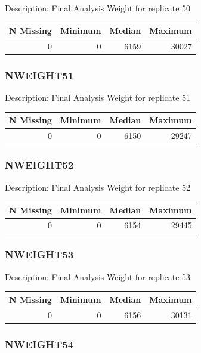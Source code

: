 \documentclass[
]{krantz}
\begin{document}
Description: Final Analysis Weight for replicate 50

\begin{tabular}[t]{r|r|r|r}
\hline
N Missing & Minimum & Median & Maximum\\
\hline
0 & 0 & 6159 & 30027\\
\hline
\end{tabular}

\hypertarget{nweight51}{%
\subsubsection*{NWEIGHT51}\label{nweight51}}


Description: Final Analysis Weight for replicate 51

\begin{tabular}[t]{r|r|r|r}
\hline
N Missing & Minimum & Median & Maximum\\
\hline
0 & 0 & 6150 & 29247\\
\hline
\end{tabular}

\hypertarget{nweight52}{%
\subsubsection*{NWEIGHT52}\label{nweight52}}


Description: Final Analysis Weight for replicate 52

\begin{tabular}[t]{r|r|r|r}
\hline
N Missing & Minimum & Median & Maximum\\
\hline
0 & 0 & 6154 & 29445\\
\hline
\end{tabular}

\hypertarget{nweight53}{%
\subsubsection*{NWEIGHT53}\label{nweight53}}


Description: Final Analysis Weight for replicate 53

\begin{tabular}[t]{r|r|r|r}
\hline
N Missing & Minimum & Median & Maximum\\
\hline
0 & 0 & 6156 & 30131\\
\hline
\end{tabular}

\hypertarget{nweight54}{%
\subsubsection*{NWEIGHT54}\label{nweight54}}
\end{document}
